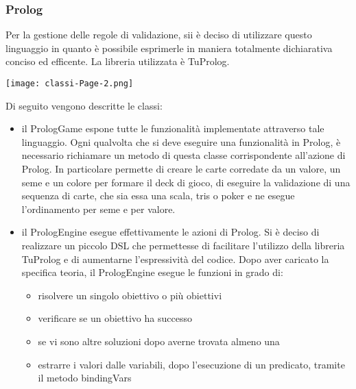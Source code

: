 \subsubsection{Prolog}
Per la gestione delle regole di validazione, sii è deciso di utilizzare questo linguaggio in quanto è possibile esprimerle in maniera totalmente dichiarativa conciso ed efficente.
La libreria utilizzata è TuProlog.
\begin{center}
    \texttt{[image: classi-Page-2.png]} %
\end{center}
Di seguito vengono descritte le classi:
\begin{itemize}
    \item il PrologGame espone tutte le funzionalità implementate attraverso tale linguaggio.
    Ogni qualvolta che si deve eseguire una funzionalità in Prolog, è necessario richiamare un metodo di questa classe corrispondente all’azione di Prolog.
    In particolare permette di creare le carte corredate da un valore, un seme e un colore per formare il deck di gioco, di eseguire la validazione di una sequenza di carte, che sia essa una scala, tris o poker e ne esegue l’ordinamento per seme e per valore.

    \item il PrologEngine esegue effettivamente le azioni di Prolog.
    Si è deciso di realizzare un piccolo DSL che permettesse di facilitare l’utilizzo della libreria TuProlog e di aumentarne l’espressività del codice.
    Dopo aver caricato la specifica teoria, il PrologEngine esegue le funzioni in grado di:
    \begin{itemize}
        \item risolvere un singolo obiettivo o più obiettivi
        \item verificare se un obiettivo ha successo
        \item se vi sono altre soluzioni dopo averne trovata almeno una
        \item estrarre i valori dalle variabili, dopo l’esecuzione di un predicato, tramite il metodo bindingVars
    \end{itemize}


\end{itemize}
